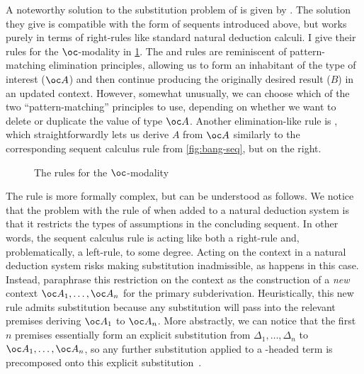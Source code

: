 A noteworthy solution to the substitution problem of  is
given by \citet{BBdePH93}.
The solution they give is compatible with the form of sequents introduced above,
but works purely in terms of right-rules like standard natural deduction
calculi.
I give their rules for the $\oc$-modality in \cref{fig:BBdePH}.
The  and  rules are reminiscent of
pattern-matching elimination principles, allowing us to form an inhabitant of
the type of interest ($\oc A$) and then continue producing the originally
desired result ($B$) in an updated context.
However, somewhat unusually, we can choose which of the two ``pattern-matching''
principles to use, depending on whether we want to delete or duplicate the
value of type $\oc A$.
Another elimination-like rule is , which straightforwardly
lets us derive $A$ from $\oc A$ similarly to the corresponding sequent calculus
rule from \cref{fig:bang-seq}, but on the right.

\begin{figure}
  \caption{The \citet{BBdePH93} rules for the $\oc$-modality}
  \label{fig:BBdePH}
\end{figure}

The \citeauthor{BBdePH93}  rule is more formally complex, but
can be understood as follows.
We notice that the problem with the  rule of
 when added to a natural deduction system is that it
restricts the types of assumptions in the concluding sequent.
In other words, the sequent calculus  rule is acting like
both a right-rule and, problematically, a left-rule, to some degree.
Acting on the context in a natural deduction system risks making substitution
inadmissible, as happens in this case.
Instead, \citeauthor{BBdePH93} paraphrase this restriction on the context as the
construction of a \emph{new} context $\oc A_1, \ldots, \oc A_n$ for the primary
subderivation.
Heuristically, this new  rule admits substitution because any
substitution will pass into the relevant premises deriving $\oc A_1$ to
$\oc A_n$.
More abstractly, we can notice that the first $n$ premises essentially form an
explicit substitution from $\Delta_1, \ldots, \Delta_n$ to
$\oc A_1, \ldots, \oc A_n$, so any further substitution applied
to a -headed term is precomposed onto this explicit
substitution~\citep{ACCL91}.

